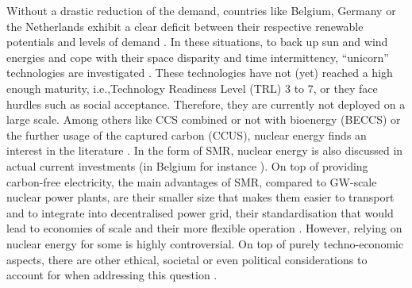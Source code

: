 \documentclass[11pt,twoside,a4paper,english]{article}
\def\ie{i.e.,}
\begin{document}
Without a drastic reduction of the demand, countries like Belgium, Germany or the Netherlands exhibit a clear deficit between their respective renewable potentials and levels of demand \cite{thiran2024exploring}. In these situations, to back up sun and wind energies and cope with their space disparity and time intermittency, ``unicorn'' technologies are investigated \cite{heuberger2018impact}. These technologies have not (yet) reached a high enough maturity, \ie Technology Readiness Level (TRL) 3 to 7, or they face hurdles such as social acceptance. Therefore, they are currently not deployed on a large scale. Among others like \gls{CCS} combined or not with bioenergy (BECCS) or the further usage of the captured carbon (CCUS), nuclear energy finds an interest in the literature \cite{IEA_Nuclear_2022,PATHS2050}. In the form of \acrfull{SMR}, nuclear energy is also discussed in actual current investments (in Belgium for instance \cite{SMRlesoir}).  On top of providing carbon-free electricity, the main advantages of \gls{SMR}, compared to GW-scale nuclear power plants, are their smaller size that makes them easier to transport and to integrate into decentralised power grid, their standardisation that would lead to economies of scale and their more flexible operation \cite{lloyd2021transport}. However, relying on nuclear energy for some is highly controversial. On top of purely techno-economic aspects, there are other ethical, societal or even political considerations to account for when addressing this question \cite{kempf2022}. 
\end{document}
